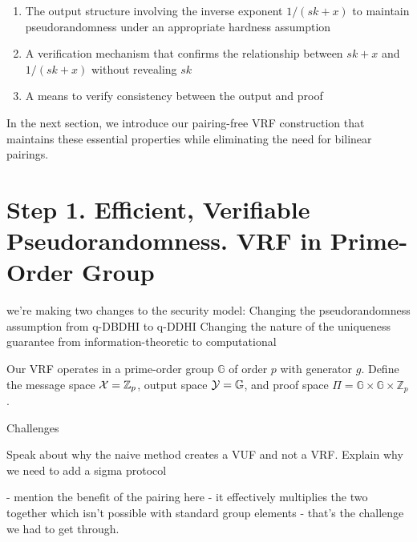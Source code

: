 \begin{enumerate}
    \item The output structure involving the inverse exponent $1/(sk+x)$ to maintain pseudorandomness under an appropriate hardness assumption
    
    \item A verification mechanism that confirms the relationship between $sk+x$ and $1/(sk+x)$ without revealing $sk$
    
    \item A means to verify consistency between the output and proof
\end{enumerate}

In the next section, we introduce our pairing-free VRF construction that maintains these essential properties while eliminating the need for bilinear pairings.







\section{Step 1. Efficient, Verifiable Pseudorandomness. VRF in Prime-Order Group}
we're making two changes to the security model:
Changing the pseudorandomness assumption from q-DBDHI to q-DDHI
Changing the nature of the uniqueness guarantee from information-theoretic to computational

Our VRF operates in a prime-order group $\mathbb{G}$ of order $p$ with generator $g$. Define the message space $\mathcal{X} = \mathbb{Z}_p$, output space $\mathcal{Y} = \mathbb{G}$, and proof space $\Pi = \mathbb{G} \times \mathbb{G} \times \mathbb{Z}_p$. 


Challenges

Speak about why the naive method creates a VUF and not a VRF. Explain why we need to add a sigma protocol



- mention the benefit of the pairing here - it effectively multiplies the two together which isn't possible with standard group elements - that's the challenge we had to get through.



